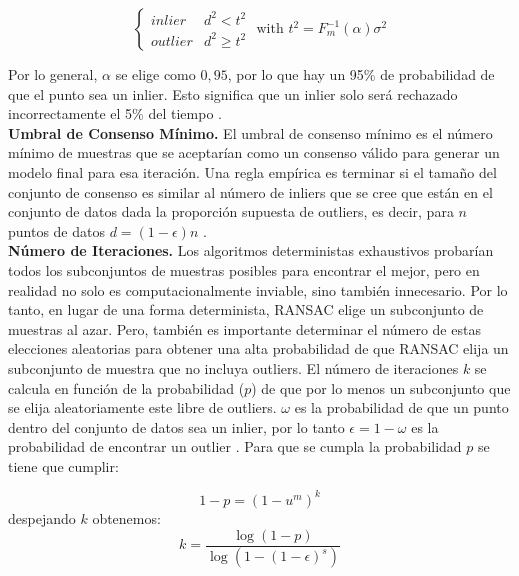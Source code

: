 $$
\left\{
\begin{array}{ll}
	inlier & d^2 < t^2\\
	outlier & d^2 \geq t^2
\end{array}
\right.
\mbox{ with } t^2 = F_{m}^{-1}(\alpha)\sigma^2
$$

Por lo general, $\alpha$ se elige como $0,95$, por lo que hay un 95\% de probabilidad de que el punto sea un inlier. Esto significa que un inlier solo será rechazado incorrectamente el 5\% del tiempo \cite{RichardAndrew}.\\

\textbf{Umbral de Consenso Mínimo.}
El umbral de consenso mínimo es el número mínimo de muestras que se aceptarían como un consenso válido para generar un modelo final para esa iteración. Una regla empírica es terminar si el tamaño del conjunto de consenso es similar al número de inliers que se cree que están en el conjunto de datos dada la proporción supuesta de outliers, es decir, para $n$ puntos de datos $d = (1 - \epsilon)n$ \cite{RichardAndrew}.\\

\textbf{Número de Iteraciones.}
Los algoritmos deterministas exhaustivos probarían todos los subconjuntos de muestras posibles para encontrar el mejor, pero en realidad no solo es computacionalmente inviable, sino también innecesario. Por lo tanto, en lugar de una forma determinista, RANSAC elige un subconjunto de muestras al azar. Pero, también es importante determinar el número de estas elecciones aleatorias para obtener una alta probabilidad de que RANSAC elija un subconjunto de muestra que no incluya outliers.
El número de iteraciones $k$ se calcula en función de la probabilidad ($p$) de que por lo menos un subconjunto que se elija aleatoriamente este libre de outliers. $\omega$ es la probabilidad de que un punto dentro del conjunto de datos sea un inlier, por lo tanto $\epsilon = 1-\omega$ es la probabilidad de encontrar un outlier \cite{PabloJuan}. Para que se cumpla la probabilidad $p$ se tiene que cumplir:

$$1 - p = (1 - u^m)^k$$
despejando $k$ obtenemos:
$$k = \frac{\log(1 - p)}{\log(1 - (1 - \epsilon)^s)}$$
